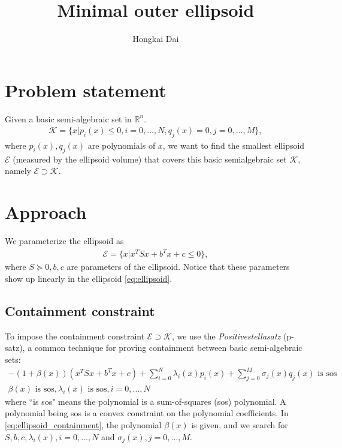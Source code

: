 \documentclass{article}
\title{Minimal outer ellipsoid}
\author{Hongkai Dai}
\date{}
\begin{document}
\maketitle
\section{Problem statement}
Given a basic semi-algebraic set in $\mathbb{R}^n$.
\begin{align}
	\mathcal{K} = \{x | p_i(x) \le 0, i=0,\hdots, N, q_j(x) = 0, j=0,...,M\},
\end{align}
where $p_i(x), q_j(x)$ are polynomials of $x$, we want to find the smallest ellipsoid $\mathcal{E}$ (measured by the ellipsoid volume) that covers this basic semialgebraic set $\mathcal{K}$, namely $\mathcal{E}\supset\mathcal{K}$.

\section{Approach}
We parameterize the ellipsoid as
\begin{align}
	\mathcal{E} = \{x | x^TSx+b^Tx+c\le 0\} \label{eq:ellipsoid},
\end{align}
where $S\succeq 0, b, c$ are parameters of the ellipsoid. Notice that these parameters show up linearly in the ellipsoid \eqref{eq:ellipsoid}.

\subsection{Containment constraint}
To impose the containment constraint $\mathcal{E}\supset\mathcal{K}$, we use the \textit{Positivestellasatz} (p-satz), a common technique for proving containment between basic semi-algebraic sets:
\begin{subequations}
\begin{align}
	-(1+\beta(x))(x^TSx + b^Tx + c) + \sum_{i=0}^N \lambda_i(x) p_i(x) + \sum_{j=0}^M \sigma_j(x)q_j(x) \text{ is sos}\\
	\beta(x) \text{ is sos}, \lambda_i(x) \text{ is sos}, i=0,\hdots, N
\end{align}
	\label{eq:ellipsoid_containment}
\end{subequations}
where ``is sos" means the polynomial is a sum-of-squares (sos) polynomial. A polynomial being sos is a convex constraint on the polynomial coefficients. In \eqref{eq:ellipsoid_containment}, the polynomial $\beta(x)$ is given, and we search for $S, b, c, \lambda_i(x), i=0,\hdots, N$ and $\sigma_j(x), j=0,\hdots,M$.
\end{document}
